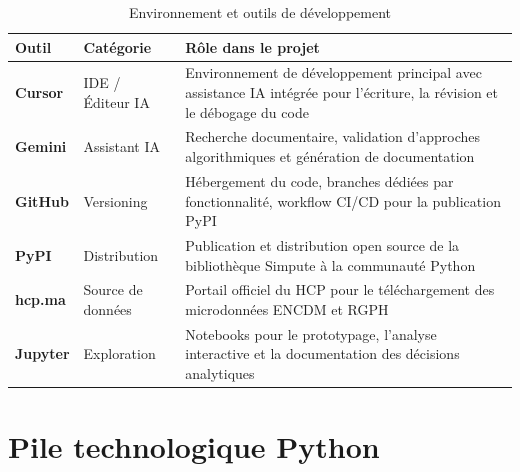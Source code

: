 \documentclass[12pt,a4paper]{report}
\begin{document}
\begin{table}[H]
\centering
\caption{Environnement et outils de développement}
\label{tab:devtools}
\begin{tabularx}{\textwidth}{L{3.5cm}L{3cm}X}
\toprule
\textbf{Outil} & \textbf{Catégorie} & \textbf{Rôle dans le projet} \\
\midrule
\textbf{Cursor} & IDE / Éditeur IA & Environnement de développement principal avec assistance IA intégrée pour l'écriture, la révision et le débogage du code \\
\textbf{Gemini} & Assistant IA & Recherche documentaire, validation d'approches algorithmiques et génération de documentation \\
\textbf{GitHub} & Versioning & Hébergement du code, branches dédiées par fonctionnalité, workflow CI/CD pour la publication PyPI \\
\textbf{PyPI} & Distribution & Publication et distribution open source de la bibliothèque Simpute à la communauté Python \\
\textbf{hcp.ma} & Source de données & Portail officiel du HCP pour le téléchargement des microdonnées ENCDM et RGPH \\
\textbf{Jupyter} & Exploration & Notebooks pour le prototypage, l'analyse interactive et la documentation des décisions analytiques \\
\bottomrule
\end{tabularx}
\end{table}

\section{Pile technologique Python}
\end{document}
